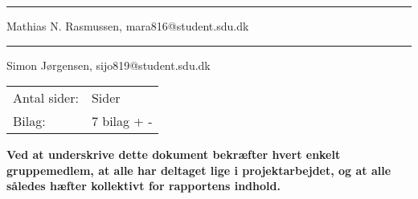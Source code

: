 \par\noindent\rule{\textwidth}{0.4pt}
\noindent
Mathias N. Rasmussen, mara816@student.sdu.dk\\
\vspace{3.5mm}

\par\noindent\rule{\textwidth}{0.4pt}
\noindent
Simon Jørgensen, sijo819@student.sdu.dk\\



\noindent
\begin{tabular}{@{}l l}
Antal sider:    & \pageref{LastPage} Sider \\
Bilag:          & 7 bilag + - 
\end{tabular}

\vspace{3.5mm}

\begin{footnotesize}
\noindent
\textbf{Ved at underskrive dette dokument bekræfter hvert enkelt gruppemedlem, at alle
har deltaget lige i projektarbejdet, og at alle således hæfter kollektivt for rapportens indhold.}
\end{footnotesize}
